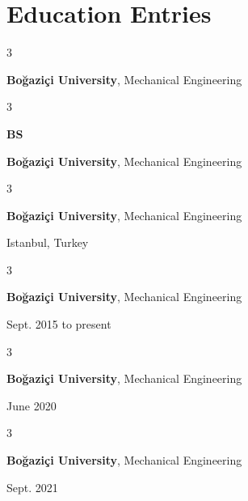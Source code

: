 \documentclass[10pt, letterpaper]{article}
\newenvironment{threecolentry}[3][]{
    \onecolentry
    \def\thirdColumn{#3}
    \setcolumnwidth{1 cm, \fill, 4.5 cm}
    \begin{paracol}{3}
    {\raggedright #2} \switchcolumn
}{
    \switchcolumn \raggedleft \thirdColumn
    \end{paracol}
    \endonecolentry
} %
\begin{document}
    
    \section{Education Entries}

        
        \begin{threecolentry}{\textbf{}}{
            
        }
            \textbf{Boğaziçi University}, Mechanical Engineering
        \end{threecolentry}

        \vspace{0.2 cm}

        \begin{threecolentry}{\textbf{BS}}{
            
        }
            \textbf{Boğaziçi University}, Mechanical Engineering
        \end{threecolentry}

        \vspace{0.2 cm}

        \begin{threecolentry}{\textbf{}}{
            Istanbul, Turkey
        }
            \textbf{Boğaziçi University}, Mechanical Engineering
        \end{threecolentry}

        \vspace{0.2 cm}

        \begin{threecolentry}{\textbf{}}{
            Sept. 2015 to present
        }
            \textbf{Boğaziçi University}, Mechanical Engineering
        \end{threecolentry}

        \vspace{0.2 cm}

        \begin{threecolentry}{\textbf{}}{
            June 2020
        }
            \textbf{Boğaziçi University}, Mechanical Engineering
        \end{threecolentry}

        \vspace{0.2 cm}

        \begin{threecolentry}{\textbf{}}{
            Sept. 2021
        }
            \textbf{Boğaziçi University}, Mechanical Engineering
        \end{threecolentry}

        \vspace{0.2 cm}
\end{document}
